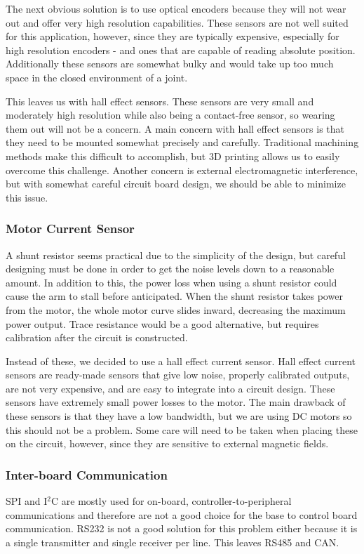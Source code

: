 \noindent The next obvious solution is to use optical encoders because they will not wear out and offer very high resolution capabilities. These sensors are not well suited for this application, however, since they are typically expensive, especially for high resolution encoders - and ones that are capable of reading absolute position. Additionally these sensors are somewhat bulky and would take up too much space in the closed environment of a joint. 

\noindent This leaves us with hall effect sensors. These sensors are very small and moderately high resolution while also being a contact-free sensor, so wearing them out will not be a concern. A main concern with hall effect sensors is that they need to be mounted somewhat precisely and carefully. Traditional machining methods make this difficult to accomplish, but 3D printing allows us to easily overcome this challenge.  Another concern is external electromagnetic interference, but with somewhat careful circuit board design, we should be able to minimize this issue.

\subsubsection{Motor Current Sensor}
A shunt resistor seems practical due to the simplicity of the design, but careful designing must be done in order to get the noise levels down to a reasonable amount. In addition to this, the power loss when using a shunt resistor could cause the arm to stall before anticipated. When the shunt resistor takes power from the motor, the whole motor curve slides inward, decreasing the maximum power output. Trace resistance would be a good alternative, but requires calibration after the circuit is constructed. 

\noindent Instead of these, we decided to use a hall effect current sensor. Hall effect current sensors are ready-made sensors that give low noise, properly calibrated outputs, are not very expensive, and are easy to integrate into a circuit design. These sensors have extremely small power losses to the motor. The main drawback of these sensors is that they have a low bandwidth, but we are using DC motors so this should not be a problem. Some care will need to be taken when placing these on the circuit, however, since they are sensitive to external magnetic fields.

\subsubsection{Inter-board Communication}
SPI and I$^2$C are mostly used for on-board, controller-to-peripheral communications and therefore are not a good choice for the base to control board communication. RS232 is not a good solution for this problem either because it is a single transmitter and single receiver per line. This leaves RS485 and CAN.

